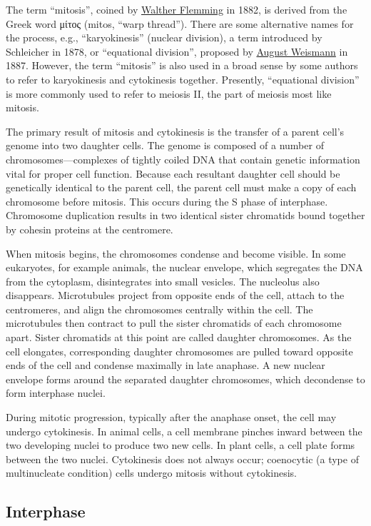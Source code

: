 The term ``mitosis'', coined by \href{https://en.wikipedia.org/wiki/Walther_Flemming}{Walther Flemming} in 1882, is derived from the Greek word μίτος (mitos, ``warp thread''). There are some alternative names for the process, e.g., ``karyokinesis'' (nuclear division), a term introduced by Schleicher in 1878, or ``equational division'', proposed by \href{https://en.wikipedia.org/wiki/August_Weismann}{August Weismann} in 1887. However, the term ``mitosis'' is also used in a broad sense by some authors to refer to karyokinesis and cytokinesis together. Presently, ``equational division'' is more commonly used to refer to meiosis II, the part of meiosis most like mitosis.

The primary result of mitosis and cytokinesis is the transfer of a parent cell's genome into two daughter cells. The genome is composed of a number of chromosomes---complexes of tightly coiled DNA that contain genetic information vital for proper cell function. Because each resultant daughter cell should be genetically identical to the parent cell, the parent cell must make a copy of each chromosome before mitosis. This occurs during the S phase of interphase. Chromosome duplication results in two identical sister chromatids bound together by cohesin proteins at the centromere.

When mitosis begins, the chromosomes condense and become visible. In some eukaryotes, for example animals, the nuclear envelope, which segregates the DNA from the cytoplasm, disintegrates into small vesicles. The nucleolus also disappears. Microtubules project from opposite ends of the cell, attach to the centromeres, and align the chromosomes centrally within the cell. The microtubules then contract to pull the sister chromatids of each chromosome apart. Sister chromatids at this point are called daughter chromosomes. As the cell elongates, corresponding daughter chromosomes are pulled toward opposite ends of the cell and condense maximally in late anaphase. A new nuclear envelope forms around the separated daughter chromosomes, which decondense to form interphase nuclei.

During mitotic progression, typically after the anaphase onset, the cell may undergo cytokinesis. In animal cells, a cell membrane pinches inward between the two developing nuclei to produce two new cells. In plant cells, a cell plate forms between the two nuclei. Cytokinesis does not always occur; coenocytic (a type of multinucleate condition) cells undergo mitosis without cytokinesis.

\hypertarget{interphase-1}{%
\subsection{Interphase}\label{interphase-1}}

